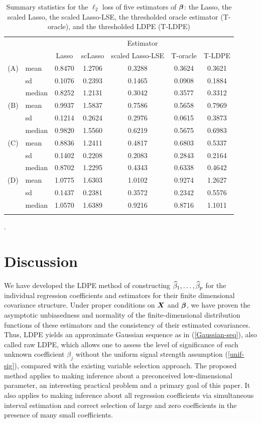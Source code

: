 \documentclass[11pt]{amsart}
\begin{document}
\begin{table}%
\begin{tabular}{rlccccc}
\toprule
&&\multicolumn{5}{c}{Estimator}\\
\cmidrule(lr){3-7}
&& Lasso & scLasso &{scaled Lasso-LSE} & T-oracle & T-LDPE \\ 
\midrule
 \addlinespace
(A) & mean & 0.8470 & 1.2706 & 0.3288 & 0.3624 & 0.3621\\
 & sd &0.1076 & 0.2393 & 0.1465 & 0.0908 & 0.1884\\
 & median & 0.8252&1.2131 & 0.3042 & 0.3577 & 0.3312\\
 \addlinespace
(B) & mean& 0.9937& 1.5837 & 0.7586 & 0.5658 & 0.7969\\
 & sd &0.1214& 0.2624 & 0.2976 & 0.0615 & 0.3873\\
& median &0.9820& 1.5560 & 0.6219 & 0.5675 & 0.6983\\
 \addlinespace
(C) & mean &0.8836& 1.2411 & 0.4817 & 0.6803 & 0.5337\\
 & sd &0.1402& 0.2208 & 0.2083 & 0.2843 & 0.2164\\
 & median &0.8702& 1.2295 & 0.4343 & 0.6338 & 0.4642\\
 \addlinespace
(D) & mean &1.0775& 1.6303 & 1.0102 & 0.9274 & 1.2627\\
 & sd & 0.1437&0.2381 & 0.3572 & 0.2342 & 0.5576\\
 & median &1.0570& 1.6389 & 0.9216 & 0.8716 & 1.1011\\
\bottomrule
\addlinespace
\end{tabular}
\caption{Summary statistics for the $\ell_2$ loss of five estimators of $\boldsymbol{\beta}$: 
the Lasso, the scaled Lasso, the {scaled Lasso-LSE}, the thresholded oracle estimator (T-oracle), 
and the thresholded LDPE (T-LDPE)}.
\label{table:L2}
\end{table}

\section{Discussion}

We have developed the LDPE method of constructing $\widehat{\beta}_1,\ldots,\widehat{\beta}_p$ 
for the individual regression coefficients and estimators for their finite dimensional covariance structure.  
Under proper conditions on $\boldsymbol{X}$ and $\boldsymbol{\beta}$, we have proven the asymptotic unbiasedness and normality 
of the finite-dimensional distribution functions of these estimators and the consistency 
of their estimated covariances. 
Thus, LDPE yields an approximate Gaussian sequence as in (\ref{Gaussian-seq}), also called raw LDPE, 
which allows one to assess the level of significance of each unknown coefficient $\beta_j$ 
without the uniform signal strength assumption (\ref{unif-sig}), compared with the existing 
variable selection approach. 
The proposed method applies to making inference about a preconceived low-dimensional parameter, 
an interesting practical problem and a primary goal of this paper.  
It also applies to making inference about all regression coefficients via simultaneous interval estimation 
and correct selection of large and zero coefficients in the presence of many small coefficients. 
\end{document}
